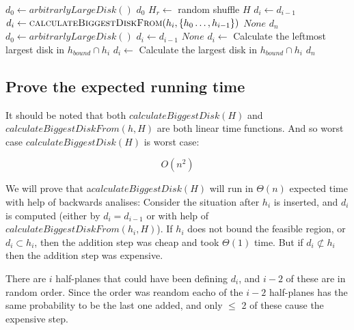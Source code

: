 \documentclass{article}
\begin{document}
\begin{algorithmic}[1]
		\State
		$d_0 \gets arbitrarlyLargeDisk()$
			\State
			\Return $d_0$
		\EndIf
		\State
		$H_r \gets$ random shuffle $H$
			\State
			$d_i \gets d_{i-1}$
			\State
			$d_i \gets \Call{calculateBiggestDiskFrom}{h_i, \{h_0\dots,h_{i-1}\}}$
				\State
				\Return $None$
			\EndIf
			\EndIf
		\EndFor
		\State
		\Return $d_n$
	\EndFunction
		\State
		$d_0 \gets arbitrarlyLargeDisk()$
			\State
			$d_i \gets d_{i-1}$
					\State
					\Return $None$
				\EndIf
				\State
				$d_i \gets$ Calculate the leftmost largest disk in $h_{bound} \cap h_{i}$
				\Else
				\State
				$d_i \gets$ Calculate the largest disk in $h_{bound} \cap h_{i}$
				\EndIf
				\State
			\EndIf
			\EndIf
		\EndFor
		\State
		\Return $d_n$
	\EndFunction
\end{algorithmic}

\subsection{Prove the expected running time}
It should be noted that both $calculateBiggestDisk(H)$ and
$calculateBiggestDiskFrom(h,H)$ are both linear time functions.
And so worst case $calculateBiggestDisk(H)$ is worst case:

\[O(n^2)\]

We will prove that a$calculateBiggestDisk(H)$ will run in $\Theta(n)$ expected
time with help of backwards analises: Consider the situation after $h_i$ is
inserted, and $d_i$ is computed (either by $d_i = d_{i-1}$ or with help
of $calculateBiggestDiskFrom(h_i,H)$). If $h_i$ does not bound the feasible
region, or $d_i \subset h_i$, then the addition step was cheap
and took $\Theta(1)$ time. But if $d_i \not\subset h_i$ then the addition
step was expensive.

There are $i$ half-planes that could have been defining $d_i$, and $i-2$
of these are in random order. Since the order was reandom eacho of the $i-2$
half-planes has the same probability to be the last one added, and only
$\leq$ 2 of these cause the expensive step.
\end{document}
